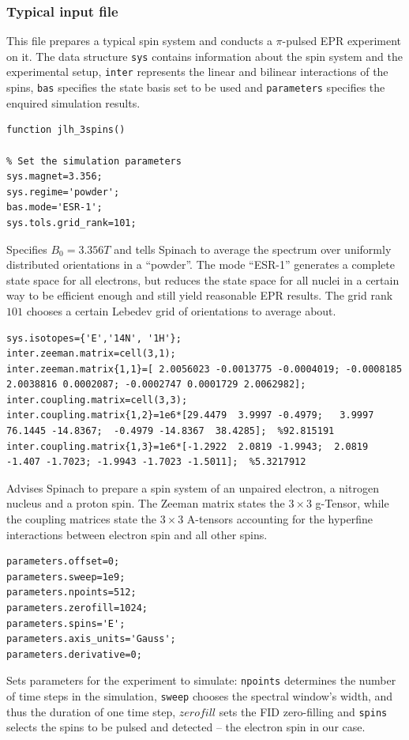 \documentclass[11.5pt,a4paper]{article}
\begin{document}
\subsubsection{Typical input file}
This file prepares a typical spin system and conducts a $\pi$-pulsed EPR experiment on it. The data structure \verb$sys$ contains information about the spin system and the experimental setup, \verb$inter$ represents the linear and bilinear interactions of the spins, \verb$bas$ specifies the state basis set to be used and \verb$parameters$ specifies the enquired simulation results. 
\begin{lstlisting}
function jlh_3spins()

% Set the simulation parameters
sys.magnet=3.356;
sys.regime='powder';
bas.mode='ESR-1';
sys.tols.grid_rank=101;
\end{lstlisting} 
Specifies $B_0 = 3.356 T$ and tells Spinach to average the spectrum over uniformly distributed orientations in a ``powder''. The mode ``ESR-1'' generates a complete state space for all electrons, but reduces the state space for all nuclei in a certain way to be efficient enough and still yield reasonable EPR results. The grid rank $101$ chooses a certain Lebedev grid of orientations to average about.
\begin{lstlisting}[firstnumber=last]
% Interactions
sys.isotopes={'E','14N', '1H'};
inter.zeeman.matrix=cell(3,1);
inter.zeeman.matrix{1,1}=[ 2.0056023 -0.0013775 -0.0004019; -0.0008185 2.0038816 0.0002087; -0.0002747 0.0001729 2.0062982];
inter.coupling.matrix=cell(3,3);
inter.coupling.matrix{1,2}=1e6*[29.4479  3.9997 -0.4979;   3.9997  76.1445 -14.8367;  -0.4979 -14.8367  38.4285];  %92.815191
inter.coupling.matrix{1,3}=1e6*[-1.2922  2.0819 -1.9943;  2.0819  -1.407 -1.7023; -1.9943 -1.7023 -1.5011];  %5.3217912
\end{lstlisting}
Advises Spinach to prepare a spin system of an unpaired electron, a nitrogen nucleus and a proton spin. The Zeeman matrix states the $3\times 3$ g-Tensor, while the coupling matrices state the $3\times 3$ A-tensors accounting for the hyperfine interactions between electron spin and all other spins.
\begin{lstlisting}[firstnumber=last]
% Set the sequence parameters
parameters.offset=0;
parameters.sweep=1e9;
parameters.npoints=512;
parameters.zerofill=1024;
parameters.spins='E';
parameters.axis_units='Gauss';
parameters.derivative=0;
\end{lstlisting}
Sets parameters for the experiment to simulate: \verb$npoints$ determines the number of time steps in the simulation, \verb$sweep$ chooses the spectral window's width, and thus the duration of one time step, $zerofill$ sets the FID zero-filling and \verb$spins$ selects the spins to be pulsed and detected -- the electron spin in our case.
\end{document}
